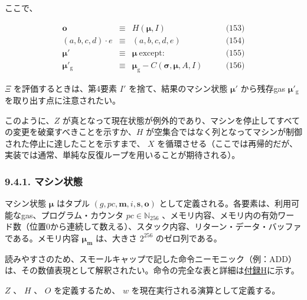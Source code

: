 \documentclass[
]{ltjsarticle}
\begin{document}
ここで、

\protect\hypertarget{eq-153}{}{}\protect\hypertarget{eq-154}{}{}\protect\hypertarget{eq-155}{}{}\protect\hypertarget{eq-156}{}{}

\[\begin{aligned}
\mathbf{o} & \equiv & H(\boldsymbol{\mu}, I) & \qquad \text{(153)} \\
(a, b, c, d) \cdot e & \equiv & (a, b, c, d, e) & \qquad \text{(154)} \\
\boldsymbol{\mu}' & \equiv & \boldsymbol{\mu}\ \text{except:} & \qquad \text{(155)} \\
\boldsymbol{\mu}'_{\mathrm{g}} & \equiv & \boldsymbol{\mu}_{\mathrm{g}} - C(\boldsymbol{\sigma}, \boldsymbol{\mu}, A, I) & \qquad \text{(156)}
\end{aligned}\]

\(\Xi\) を評価するときは、第4要素 \(I'\) を捨て、結果のマシン状態
\(\boldsymbol{\mu}'\) から残存gas \(\boldsymbol{\mu}'_{\mathrm{g}}\)
を取り出す点に注意されたい。

このように、\protect\hyperlink{zhalt}{\(Z\)}
が真となって現在状態が例外的であり、マシンを停止してすべての変更を破棄すべきことを示すか、\protect\hyperlink{hhalt}{\(H\)}
が空集合ではなく列となってマシンが制御された停止に達したことを示すまで、
\(X\)
を循環させる（ここでは再帰的だが、実装では通常、単純な反復ループを用いることが期待される）。

\hypertarget{ux30deux30b7ux30f3ux72b6ux614b}{%
\subsubsection{9.4.1. マシン状態}\label{ux30deux30b7ux30f3ux72b6ux614b}}

マシン状態 \(\boldsymbol{\mu}\) はタプル
\((g, pc, \mathbf{m}, i, \mathbf{s}, \mathbf{o})\)
として定義される。各要素は、利用可能なgas、プログラム・カウンタ
\(pc \in \mathbb{N}_{256}\)
、メモリ内容、メモリ内の有効ワード数（位置0から連続して数える）、スタック内容、リターン・データ・バッファである。メモリ内容
\(\boldsymbol{\mu}_{\mathbf{m}}\) は、大きさ \(2^{256}\)
のゼロ列である。

読みやすさのため、スモールキャップで記した命令ニーモニック（例：ADD）は、その数値表現として解釈されたい。命令の完全な表と詳細は\protect\hyperlink{app:vm}{付録H}に示す。

\(Z\) 、 \(H\) 、 \(O\) を定義するため、 \(w\)
を現在実行される演算として定義する。

\protect\hypertarget{eq-157}{}{}\protect\hypertarget{eq:currentoperation}{}{}
\end{document}
